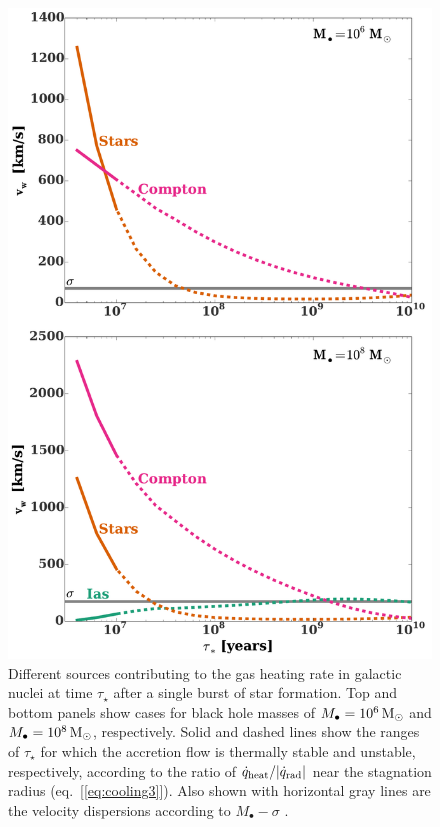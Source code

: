 \documentclass[usenatbib,fleqn]{mn2e}
\newcommand{\Mbh}[1][]{M_{\bullet#1}}
\begin{document}
\begin{figure}
\includegraphics[width=\columnwidth]{vwSourcesImp.pdf}
\caption{\label{fig:vwSourcesImp} Different sources contributing to the gas heating rate in galactic nuclei at time $\tau_{\star}$ after a single burst of star formation.  Top and bottom panels show cases for black hole masses of $\Mbh=10^6 \Msun$ and $\Mbh= 10^8 \Msun$, respectively.  Solid and dashed lines show the ranges of $\tau_{\star}$ for which the accretion flow is thermally stable and unstable, respectively, according to the ratio of $\dot{q}_{\rm heat}/|\dot{q}_{\rm rad}|$ near the stagnation radius (eq.~[\ref{eq:cooling3}]).   Also shown with horizontal gray lines are the velocity dispersions according to $\Mbh-\sigma$ \citep{McConnellMa+:2011a}.}
\end{figure}
\end{document}
